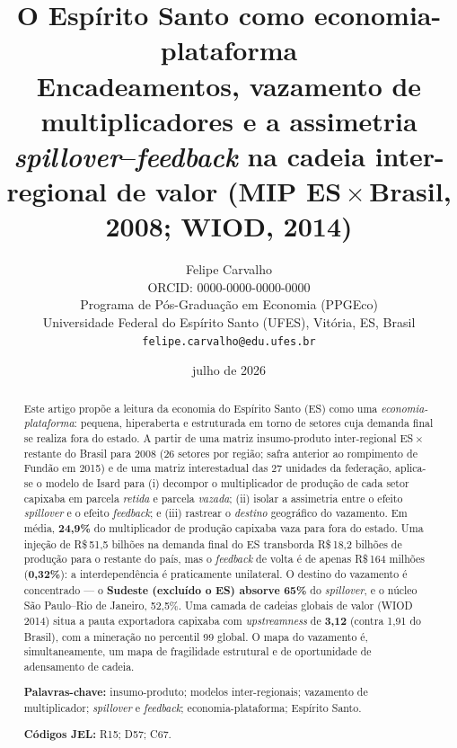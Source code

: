 \documentclass[11pt,a4paper]{article}
\title{\textbf{O Espírito Santo como economia-plataforma}\\[2pt]
\large Encadeamentos, vazamento de multiplicadores e a assimetria
\emph{spillover}--\emph{feedback} na cadeia inter-regional de valor
(MIP ES\,$\times$\,Brasil, 2008; WIOD, 2014)}
\author{Felipe Carvalho\\
\small ORCID: 0000-0000-0000-0000\\
\small Programa de Pós-Graduação em Economia (PPGEco)\\
\small Universidade Federal do Espírito Santo (UFES), Vitória, ES, Brasil\\
\small \texttt{felipe.carvalho@edu.ufes.br}}
\date{julho de 2026}
\begin{document}
\maketitle
\thispagestyle{empty}

\begin{abstract}
\noindent
Este artigo propõe a leitura da economia do Espírito Santo (ES) como uma
\emph{economia-plataforma}: pequena, hiperaberta e estruturada em torno de
setores cuja demanda final se realiza fora do estado. A partir de uma matriz
insumo-produto inter-regional ES\,$\times$\,restante do Brasil para 2008
(26 setores por região; safra anterior ao rompimento de Fundão em 2015) e de
uma matriz interestadual das 27 unidades da
federação, aplica-se o modelo de Isard para (i) decompor o multiplicador de
produção de cada setor capixaba em parcela \emph{retida} e parcela
\emph{vazada}; (ii) isolar a assimetria entre o efeito \emph{spillover} e o
efeito \emph{feedback}; e (iii) rastrear o \emph{destino} geográfico do
vazamento. Em média, \textbf{24,9\%} do multiplicador de produção capixaba
vaza para fora do estado. Uma injeção de R\$\,51,5 bilhões na demanda final
do ES transborda R\$\,18,2 bilhões de produção para o restante do país, mas
o \emph{feedback} de volta é de apenas R\$\,164 milhões (\textbf{0,32\%}): a
interdependência é praticamente unilateral. O destino do vazamento é
concentrado --- o \textbf{Sudeste (excluído o ES) absorve 65\%} do
\emph{spillover}, e o núcleo São Paulo--Rio de Janeiro, 52,5\%. Uma camada de
cadeias globais de valor (WIOD 2014) situa a pauta exportadora capixaba com
\emph{upstreamness} de \textbf{3,12} (contra 1,91 do Brasil), com a mineração
no percentil 99 global. O mapa do vazamento é, simultaneamente, um mapa de
fragilidade estrutural e de oportunidade de adensamento de cadeia.

\vspace{0.6em}
\noindent\textbf{Palavras-chave:} insumo-produto; modelos inter-regionais;
vazamento de multiplicador; \emph{spillover} e \emph{feedback};
economia-plataforma; Espírito Santo.

\noindent\textbf{Códigos JEL:} R15; D57; C67.
\end{abstract}
\end{document}
